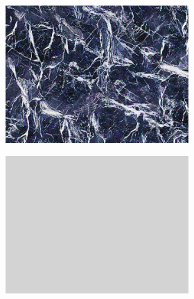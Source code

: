 \begin{figure}[]
\begin{subfigure}{\textwidth}
        \begin{subfigure}{0.19\textwidth}
            \centering
            \includegraphics[width=\textwidth]{images/04-experiment02/isolating_issues/target.jpg}
        \end{subfigure}
        \hfill
        \begin{subfigure}{0.19\textwidth}
            \centering
            \includegraphics[width=\textwidth]{images/04-experiment02/isolating_issues/210_bg.jpg}
        \end{subfigure}
        \hfill
        \begin{subfigure}{0.6\textwidth}
            \centering
            \begin{subfigure}{0.32\textwidth}

\end{subfigure}
\end{subfigure}
\end{subfigure}
\end{figure}
